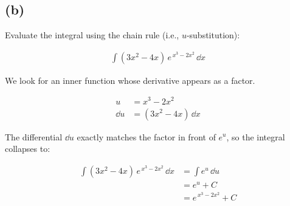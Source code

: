 \subsection*{(b)}

\begin{tcolorbox}[
    colback=blue!5,
    colframe=blue!75!black,
    title=\textbf{Problem: Chain Rule in Integration},
    fonttitle=\large,
    arc=2mm
]
    Evaluate the integral using the chain rule (i.e., \(u\)-substitution):

    \begin{align*}
        \int (3x^{2} - 4x)\, e^{\,x^{3} - 2x^{2}} \, \dd x
    \end{align*}

\end{tcolorbox}

We look for an inner function whose derivative appears as a factor.

\begin{align*}
    u & = x^{3} - 2x^{2} \\
    \dd u & = (3x^{2} - 4x)\, \dd x
\end{align*}

The differential \(\dd u\) exactly matches the factor in front of \(e^{u}\), so the integral collapses to:

\begin{align*}
    \int (3x^{2} - 4x)\, e^{\,x^{3} - 2x^{2}} \, \dd x
    & = \int e^{u} \, \dd u \\
    & = e^{u} + C \\
    & = \boxed{e^{\,x^{3} - 2x^{2}} + C}
\end{align*}
